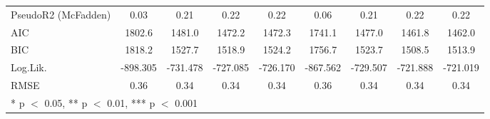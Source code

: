 \begin{table}
\begin{tabular}[t]{lcccccccc}
PseudoR2 (McFadden) & 0.03 & 0.21 & 0.22 & 0.22 & 0.06 & 0.21 & 0.22 & 0.22\\
AIC & 1802.6 & 1481.0 & 1472.2 & 1472.3 & 1741.1 & 1477.0 & 1461.8 & 1462.0\\
BIC & 1818.2 & 1527.7 & 1518.9 & 1524.2 & 1756.7 & 1523.7 & 1508.5 & 1513.9\\
Log.Lik. & -898.305 & -731.478 & -727.085 & -726.170 & -867.562 & -729.507 & -721.888 & -721.019\\
RMSE & 0.36 & 0.34 & 0.34 & 0.34 & 0.36 & 0.34 & 0.34 & 0.34\\
\bottomrule
\multicolumn{9}{l}{\rule{0pt}{1em}* p $<$ 0.05, ** p $<$ 0.01, *** p $<$ 0.001}\\
\end{tabular}
\end{table}
